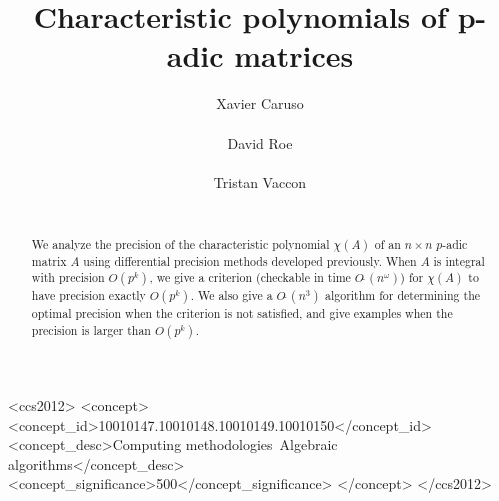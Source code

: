 \documentclass{sig-alternate-05-2015}
\newcommand{\softO}{O\tilde{~}}
\begin{document}
\newtheorem{theo}{Theorem}[section]
\newtheorem{lem}[theo]{Lemma}
\newtheorem{prop}[theo]{Proposition}
\newtheorem{cor}[theo]{Corollary}
\newtheorem{quest}[theo]{Question}
\newtheorem{conj}[theo]{Conjecture}
\theoremstyle{definition}
\newtheorem{rem}[theo]{Remark}
\newtheorem{ex}[theo]{Example}
\newtheorem{deftn}[theo]{Definition}

\title{Characteristic polynomials of p-adic matrices}

\author{
\alignauthor Xavier Caruso\\
  \\
\alignauthor David Roe\\
  \\
\alignauthor Tristan Vaccon\\
  \\
}

\maketitle

\begin{abstract}
We analyze the precision of the characteristic polynomial $\chi(A)$ of
an $n \times n$ $p$-adic matrix $A$ using differential precision methods
developed previously.  When $A$ is integral with precision $O(p^k)$,
we give a criterion (checkable in time $\softO(n^\omega)$) for
$\chi(A)$ to have precision exactly $O(p^k)$.  We also give a $\softO(n^3)$
algorithm for determining the optimal precision when the criterion is not
satisfied, and give examples when the precision is larger than $O(p^k)$.
\end{abstract}

\begin{CCSXML}
<ccs2012>
<concept>
<concept_id>10010147.10010148.10010149.10010150</concept_id>
<concept_desc>Computing methodologies~Algebraic algorithms</concept_desc>
<concept_significance>500</concept_significance>
</concept>
</ccs2012>
\end{CCSXML}

\vspace{-1mm}
\printccsdesc

\vspace{-1.5mm}
\end{document}
